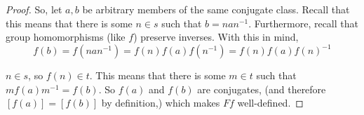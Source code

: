 \documentclass[main.tex]{subfiles}
\begin{document}
\begin{proof}
	So, let \(a, b\) be arbitrary members of the same conjugate class. Recall
	that this means that there is some \(n\in s\) such that \(b = nan^{-1}\).
	Furthermore, recall that group homomorphisms (like \(f\)) preserve inverses.
	With this in mind, \[f(b) = f(nan^{-1}) = f(n)f(a)f(n^{-1}) =
	f(n)f(a)f(n)^{-1}\]

	\(n\in s\), so \(f(n)\in t\). This means that there is some \(m\in t\) such
	that \(mf(a)m^{-1} = f(b)\). So \(f(a)\) and \(f(b)\) are conjugates, (and
	therefore \([f(a)] = [f(b)]\) by definition,) which makes \(Ff\)
	well-defined.
\end{proof}
\end{document}
